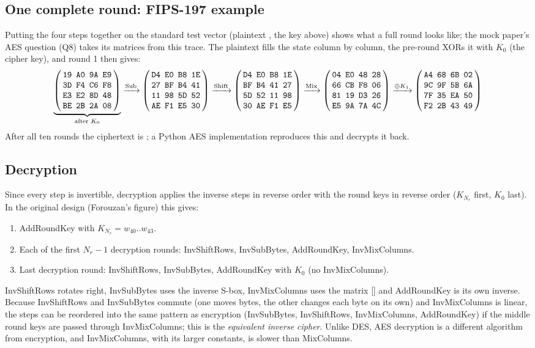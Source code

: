 \subsection{One complete round: FIPS-197 example}
Putting the four steps together on the standard test vector (plaintext , the key above) shows what a full round looks like; the mock paper's AES question (Q8) takes its matrices from this trace. The plaintext fills the state column by column, the pre-round XORs it with $K_0$ (the cipher key), and round 1 then gives:
\begingroup\small
\[
\underbrace{\aesM{19&A0&9A&E9\\3D&F4&C6&F8\\E3&E2&8D&48\\BE&2B&2A&08}}_{\text{after } K_0}
\xrightarrow{\text{Sub}}
\aesM{D4&E0&B8&1E\\27&BF&B4&41\\11&98&5D&52\\AE&F1&E5&30}
\xrightarrow{\text{Shift}}
\aesM{D4&E0&B8&1E\\BF&B4&41&27\\5D&52&11&98\\30&AE&F1&E5}
\xrightarrow{\text{Mix}}
\aesM{04&E0&48&28\\66&CB&F8&06\\81&19&D3&26\\E5&9A&7A&4C}
\xrightarrow{\oplus K_1}
\aesM{A4&68&6B&02\\9C&9F&5B&6A\\7F&35&EA&50\\F2&2B&43&49}
\]
\endgroup
After all ten rounds the ciphertext is ; a Python AES implementation reproduces this and decrypts it back.

\subsection{Decryption}
Since every step is invertible, decryption applies the inverse steps in reverse order with the round keys in reverse order ($K_{N_r}$ first, $K_0$ last). In the original design (Forouzan's figure) this gives:
\begin{enumerate}
  \item AddRoundKey with $K_{N_r} = w_{40}..w_{43}$.
  \item Each of the first $N_r - 1$ decryption rounds: InvShiftRows, InvSubBytes, AddRoundKey, InvMixColumns.
  \item Last decryption round: InvShiftRows, InvSubBytes, AddRoundKey with $K_0$ (no InvMixColumns).
\end{enumerate}
InvShiftRows rotates right, InvSubBytes uses the inverse S-box, InvMixColumns uses the matrix [] and AddRoundKey is its own inverse. Because InvShiftRows and InvSubBytes commute (one moves bytes, the other changes each byte on its own) and InvMixColumns is linear, the steps can be reordered into the same pattern as encryption (InvSubBytes, InvShiftRows, InvMixColumns, AddRoundKey) if the middle round keys are passed through InvMixColumns; this is the \emph{equivalent inverse cipher}. Unlike DES, AES decryption is a different algorithm from encryption, and InvMixColumns, with its larger constants, is slower than MixColumns.

